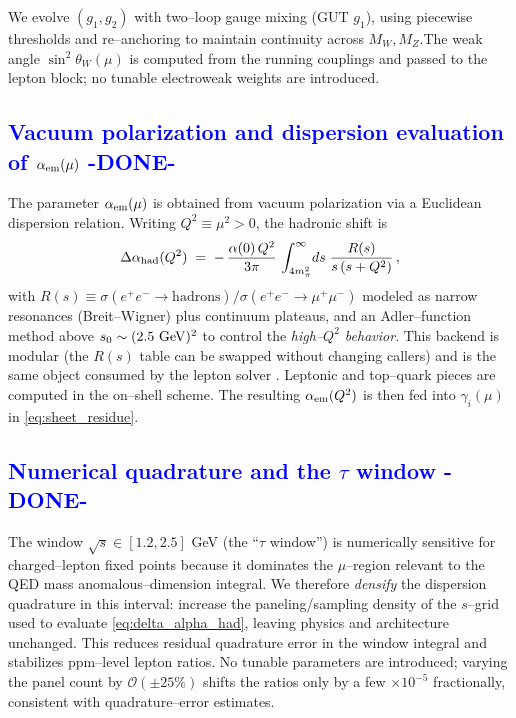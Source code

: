 \documentclass[%
 amsmath,amssymb,
 aps,
prb,
floatfix, showkeys
]{revtex4-2}
\newcommand{\modif}[1]{\textcolor{blue}{#1}}
\begin{document}
 We evolve $(g_1,g_2)$ with two--loop gauge mixing (GUT $g_1$), using piecewise thresholds and re--anchoring to maintain continuity across $M_W,M_Z$.\;The weak angle $\sin^2\theta_W(\mu)$ is computed from the running couplings and passed to the lepton block; no tunable electroweak weights are introduced.






{\modif{
\subsection{Vacuum polarization and dispersion evaluation of $\alpha_{\rm em}(\mu)$  -DONE-}  %
\label{subsec:dispersion_alphaem}
}}
The parameter $\alpha_{\rm em}(\mu)$ is obtained from vacuum polarization via a Euclidean dispersion
relation. Writing $Q^2\equiv\mu^2>0$, the hadronic shift is
\begin{equation}
  \Delta\alpha_{\rm had}(Q^2) \;=\; -\,\frac{\alpha(0)\,Q^2}{3\pi}\,\int_{4m_\pi^2}^{\infty}\! ds\;\frac{R(s)}{s\,(s+Q^2)}\,,
  \label{eq:delta_alpha_had}
\end{equation}
with $R(s)\equiv \sigma(e^+e^-\!\to\!\text{hadrons})/\sigma(e^+e^-\!\to\!\mu^+\mu^-)$ modeled as narrow resonances (Breit–Wigner) plus continuum plateaus, and an Adler–function method above $s_0\sim(2.5~{\rm GeV})^2$ to control the \emph{high–$Q^2$ behavior}.
This backend is modular (the $R(s)$ table can be swapped without changing callers) and is the same object consumed by the lepton solver \cite{EidelmanJegerlehner1995,Jegerlehner2003,Keshavarzi2019,Davier2017}.
Leptonic and top–quark pieces are computed in the on–shell scheme. The resulting $\alpha_{\rm em}(Q^2)$ is then fed into $\gamma_i(\mu)$ in \eqref{eq:sheet_residue}.






{\modif{
\subsection{Numerical quadrature and the $\tau$ window -DONE- }
\label{subsec:tau_window}
}}
The window $\sqrt{s}\in[1.2,2.5]$ GeV (the ``$\tau$ window'') is numerically sensitive for charged–lepton fixed points because it dominates the $\mu$–region relevant to the QED mass anomalous–dimension integral. We therefore \emph{densify} the dispersion quadrature in this interval: increase the paneling/sampling density of the $s$–grid used to evaluate \eqref{eq:delta_alpha_had}, leaving physics and architecture unchanged. This reduces residual quadrature error in the window integral and stabilizes ppm–level lepton ratios. No tunable parameters are introduced; varying the panel count by $\mathcal{O}(\pm 25\%)$ shifts the ratios only by a few $\times 10^{-5}$ fractionally, consistent with quadrature–error estimates.
\end{document}
